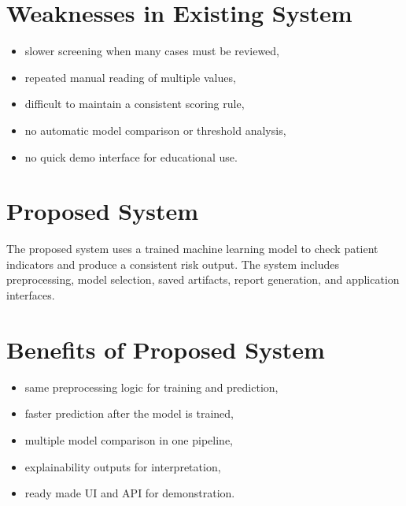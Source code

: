 \documentclass[12pt,a4paper,openany]{report}
\begin{document}
    \section{Weaknesses in Existing System}
    \begin{itemize}[leftmargin=1.4cm]
    \item slower screening when many cases must be reviewed,
    \item repeated manual reading of multiple values,
    \item difficult to maintain a consistent scoring rule,
    \item no automatic model comparison or threshold analysis,
    \item no quick demo interface for educational use.
    \end{itemize}

    \section{Proposed System}
    The proposed system uses a trained machine learning model to check patient indicators and produce a consistent risk output. The system includes preprocessing, model selection, saved artifacts, report generation, and application interfaces.

    \section{Benefits of Proposed System}
    \begin{itemize}[leftmargin=1.4cm]
    \item same preprocessing logic for training and prediction,
    \item faster prediction after the model is trained,
    \item multiple model comparison in one pipeline,
    \item explainability outputs for interpretation,
    \item ready made UI and API for demonstration.
    \end{itemize}
\end{document}
